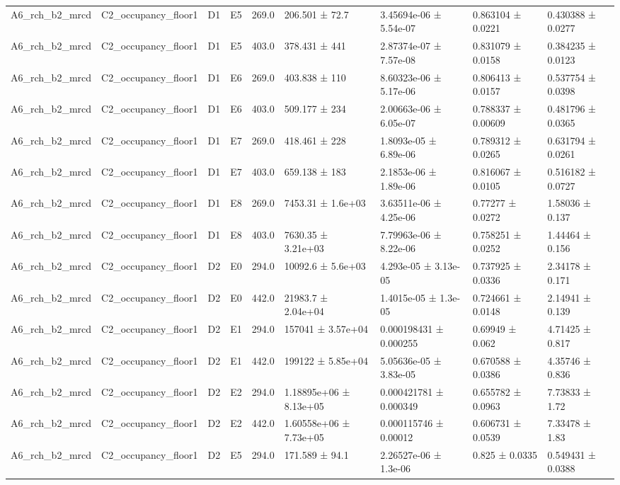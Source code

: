 \begin{table}
\begin{tabular}{lllllllll}
A6\_rch\_b2\_mrcd & C2\_occupancy\_floor1 & D1 & E5 & 269.0 & 206.501 ± 72.7 & 3.45694e-06 ± 5.54e-07 & 0.863104 ± 0.0221 & 0.430388 ± 0.0277 \\
A6\_rch\_b2\_mrcd & C2\_occupancy\_floor1 & D1 & E5 & 403.0 & 378.431 ± 441 & 2.87374e-07 ± 7.57e-08 & 0.831079 ± 0.0158 & 0.384235 ± 0.0123 \\
A6\_rch\_b2\_mrcd & C2\_occupancy\_floor1 & D1 & E6 & 269.0 & 403.838 ± 110 & 8.60323e-06 ± 5.17e-06 & 0.806413 ± 0.0157 & 0.537754 ± 0.0398 \\
A6\_rch\_b2\_mrcd & C2\_occupancy\_floor1 & D1 & E6 & 403.0 & 509.177 ± 234 & 2.00663e-06 ± 6.05e-07 & 0.788337 ± 0.00609 & 0.481796 ± 0.0365 \\
A6\_rch\_b2\_mrcd & C2\_occupancy\_floor1 & D1 & E7 & 269.0 & 418.461 ± 228 & 1.8093e-05 ± 6.89e-06 & 0.789312 ± 0.0265 & 0.631794 ± 0.0261 \\
A6\_rch\_b2\_mrcd & C2\_occupancy\_floor1 & D1 & E7 & 403.0 & 659.138 ± 183 & 2.1853e-06 ± 1.89e-06 & 0.816067 ± 0.0105 & 0.516182 ± 0.0727 \\
A6\_rch\_b2\_mrcd & C2\_occupancy\_floor1 & D1 & E8 & 269.0 & 7453.31 ± 1.6e+03 & 3.63511e-06 ± 4.25e-06 & 0.77277 ± 0.0272 & 1.58036 ± 0.137 \\
A6\_rch\_b2\_mrcd & C2\_occupancy\_floor1 & D1 & E8 & 403.0 & 7630.35 ± 3.21e+03 & 7.79963e-06 ± 8.22e-06 & 0.758251 ± 0.0252 & 1.44464 ± 0.156 \\
A6\_rch\_b2\_mrcd & C2\_occupancy\_floor1 & D2 & E0 & 294.0 & 10092.6 ± 5.6e+03 & 4.293e-05 ± 3.13e-05 & 0.737925 ± 0.0336 & 2.34178 ± 0.171 \\
A6\_rch\_b2\_mrcd & C2\_occupancy\_floor1 & D2 & E0 & 442.0 & 21983.7 ± 2.04e+04 & 1.4015e-05 ± 1.3e-05 & 0.724661 ± 0.0148 & 2.14941 ± 0.139 \\
A6\_rch\_b2\_mrcd & C2\_occupancy\_floor1 & D2 & E1 & 294.0 & 157041 ± 3.57e+04 & 0.000198431 ± 0.000255 & 0.69949 ± 0.062 & 4.71425 ± 0.817 \\
A6\_rch\_b2\_mrcd & C2\_occupancy\_floor1 & D2 & E1 & 442.0 & 199122 ± 5.85e+04 & 5.05636e-05 ± 3.83e-05 & 0.670588 ± 0.0386 & 4.35746 ± 0.836 \\
A6\_rch\_b2\_mrcd & C2\_occupancy\_floor1 & D2 & E2 & 294.0 & 1.18895e+06 ± 8.13e+05 & 0.000421781 ± 0.000349 & 0.655782 ± 0.0963 & 7.73833 ± 1.72 \\
A6\_rch\_b2\_mrcd & C2\_occupancy\_floor1 & D2 & E2 & 442.0 & 1.60558e+06 ± 7.73e+05 & 0.000115746 ± 0.00012 & 0.606731 ± 0.0539 & 7.33478 ± 1.83 \\
A6\_rch\_b2\_mrcd & C2\_occupancy\_floor1 & D2 & E5 & 294.0 & 171.589 ± 94.1 & 2.26527e-06 ± 1.3e-06 & 0.825 ± 0.0335 & 0.549431 ± 0.0388 \\

\end{tabular}
\end{table}
